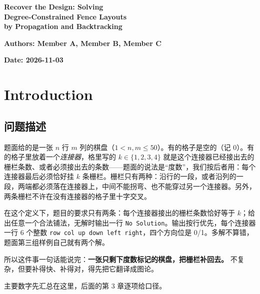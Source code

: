 \documentclass[12pt,a4paper,fontset=windows]{ctexart}
\newcommand{\code}[1]{\texttt{#1}}
\begin{document}
\begin{titlepage}
\centering
\vspace*{2.0cm}
{\bfseries\fontsize{24}{31}\selectfont Recover the Design: Solving\\[0.3em]
Degree-Constrained Fence Layouts\\[0.3em]
by Propagation and Backtracking}

\vspace{1.6cm}
{\bfseries\fontsize{15}{20}\selectfont Authors: Member A, Member B, Member C}

\vspace{1.2cm}
{\bfseries\fontsize{13}{16}\selectfont Date: 2026-11-03}
\end{titlepage}

\section{Introduction}

\subsection{问题描述}

题面给的是一张 $n$ 行 $m$ 列的棋盘（$1<n,m\le 50$）。有的格子是空的（记 0）。有的格子里放着一个\emph{连接器}，格里写的 $k\in\{1,2,3,4\}$ 就是这个连接器已经接出去的栅栏条数、或者必须接出去的条数——题面的说法是“度数”，我们按后者用：每个连接器最后必须恰好挂 $k$ 条栅栏。栅栏只有两种：沿行的一段，或者沿列的一段，两端都必须落在连接器上，中间不能拐弯、也不能穿过另一个连接器。另外，两条栅栏不许在没有连接器的格子里十字交叉。

在这个定义下，题目的要求只有两条：每个连接器接出的栅栏条数恰好等于 $k$；给出任意一个合法铺法，无解时输出一行 \code{No Solution}。输出按行优先，每个连接器一行 6 个整数 \code{row col up down left right}，四个方向位是 0/1。多解不算错，题面第三组样例自己就有两个解。

所以这件事一句话能说完：\textbf{一张只剩下度数标记的棋盘，把栅栏补回去。} 不复杂，但要补得快、补得对，得先把它翻译成图论。

主要数字先汇总在这里，后面的第 3 章逐项给口径。
\end{document}
